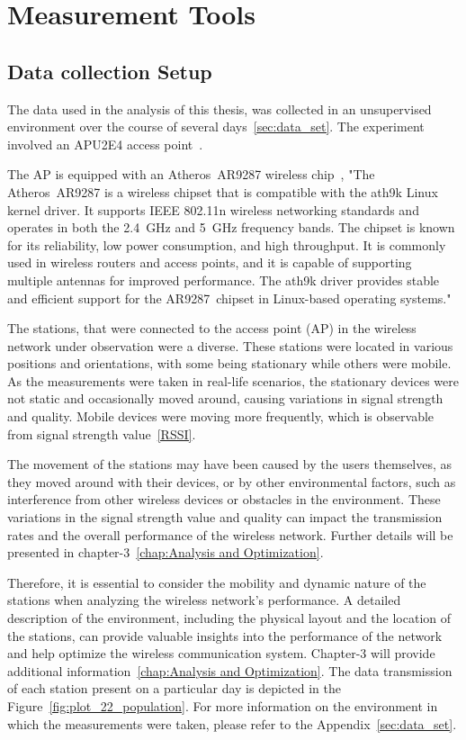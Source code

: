 \chapter{Measurement Tools}
\label{chap:Measurement Tools}

\section{Data collection Setup}
\label{sec:Measurement Tools:Data collection Setup}

The data used in the analysis of this thesis, was collected in an unsupervised environment over the course of several days~\ref{sec:data_set}. The experiment involved an APU2E4 access point~\cite{PC_Engines_apu2e4}.

The AP is  equipped with an Atheros~AR9287 wireless chip~\cite{atheros-ar9287}, "The Atheros~AR9287 is a wireless chipset that is compatible with the ath9k Linux kernel driver. It supports IEEE 802.11n wireless networking standards and operates in both the 2.4~GHz and 5~GHz frequency bands. The chipset is known for its reliability, low power consumption, and high throughput. It is commonly used in wireless routers and access points, and it is capable of supporting multiple antennas for improved performance. The ath9k driver provides stable and efficient support for the AR9287~chipset in Linux-based operating systems."

The stations, that were connected to the access point (AP) in the wireless network under observation were a diverse. These stations were located in various positions and orientations, with some being stationary while others were mobile. As the measurements were taken in real-life scenarios, the stationary devices were not static and occasionally moved around, causing variations in signal strength and quality. Mobile devices were moving more frequently, which is observable from signal strength value~\ref{RSSI}.

The movement of the stations may have been caused by the users themselves, as they moved around with their devices, or by other environmental factors, such as interference from other wireless devices or obstacles in the environment. These variations in the signal strength value and quality can impact the transmission rates and the overall performance of the wireless network. Further details will be presented in chapter-3~\ref{chap:Analysis and Optimization}.

Therefore, it is essential to consider the mobility and dynamic nature of the stations when analyzing the wireless network's performance. A detailed description of the environment, including the physical layout and the location of the stations, can provide valuable insights into the performance of the network and help optimize the wireless communication system. Chapter-3 will provide additional information~\ref{chap:Analysis and Optimization}.
The data transmission of each station present on a particular day is depicted in the Figure~\ref{fig:plot_22_population}. For more information on the environment in which the measurements were taken, please refer to the Appendix~\ref{sec:data_set}. 

